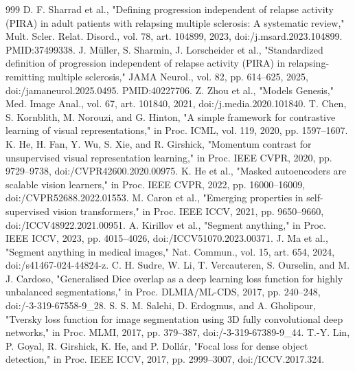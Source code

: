 \documentclass[journal,twoside,web]{ieeecolor}
\begin{document}
\begin{thebibliography}{999}
 D. F. Sharrad et al., "Defining progression independent of relapse activity (PIRA) in adult patients with relapsing multiple sclerosis: A systematic review," Mult. Scler. Relat. Disord., vol. 78, art. 104899, 2023, doi:/\allowbreak j.msard.2023.104899. PMID:37499338.
 J. Müller, S. Sharmin, J. Lorscheider et al., "Standardized definition of progression independent of relapse activity (PIRA) in relapsing-remitting multiple sclerosis," JAMA Neurol., vol. 82, pp. 614--625, 2025, doi:/\allowbreak jamaneurol.2025.0495. PMID:40227706.
 Z. Zhou et al., "Models Genesis," Med. Image Anal., vol. 67, art. 101840, 2021, doi:/\allowbreak j.media.2020.101840.
 T. Chen, S. Kornblith, M. Norouzi, and G. Hinton, "A simple framework for contrastive learning of visual representations," in Proc. ICML, vol. 119, 2020, pp. 1597--1607.
 K. He, H. Fan, Y. Wu, S. Xie, and R. Girshick, "Momentum contrast for unsupervised visual representation learning," in Proc. IEEE CVPR, 2020, pp. 9729--9738, doi:/\allowbreak CVPR42600.2020.00975.
 K. He et al., "Masked autoencoders are scalable vision learners," in Proc. IEEE CVPR, 2022, pp. 16000--16009, doi:/\allowbreak CVPR52688.2022.01553.
 M. Caron et al., "Emerging properties in self-supervised vision transformers," in Proc. IEEE ICCV, 2021, pp. 9650--9660, doi:/\allowbreak ICCV48922.2021.00951.
 A. Kirillov et al., "Segment anything," in Proc. IEEE ICCV, 2023, pp. 4015--4026, doi:/\allowbreak ICCV51070.2023.00371.
 J. Ma et al., "Segment anything in medical images," Nat. Commun., vol. 15, art. 654, 2024, doi:/\allowbreak s41467-024-44824-z.
 C. H. Sudre, W. Li, T. Vercauteren, S. Ourselin, and M. J. Cardoso, "Generalised Dice overlap as a deep learning loss function for highly unbalanced segmentations," in Proc. DLMIA/\allowbreak ML-CDS, 2017, pp. 240--248, doi:/-3-319-67558-9\_28.
 S. S. M. Salehi, D. Erdogmus, and A. Gholipour, "Tversky loss function for image segmentation using 3D fully convolutional deep networks," in Proc. MLMI, 2017, pp. 379--387, doi:/-3-319-67389-9\_44.
 T.-Y. Lin, P. Goyal, R. Girshick, K. He, and P. Dollár, "Focal loss for dense object detection," in Proc. IEEE ICCV, 2017, pp. 2999--3007, doi:/\allowbreak ICCV.2017.324.

\end{thebibliography}
\end{document}
